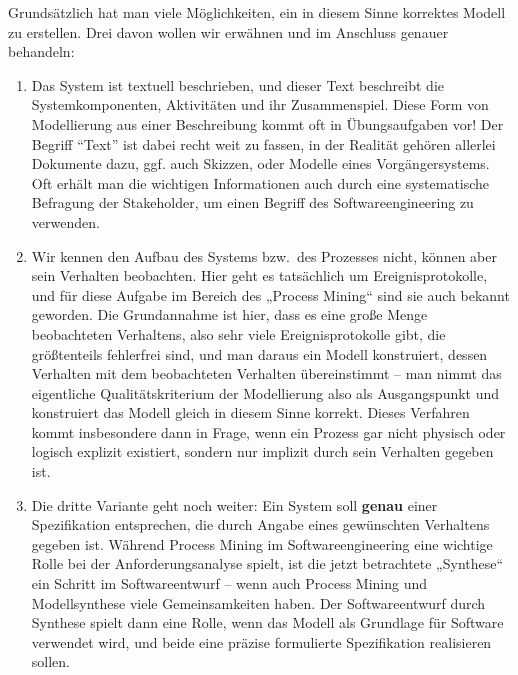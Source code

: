 Grundsätzlich hat man viele Möglichkeiten, ein in diesem Sinne korrektes Modell zu erstellen. Drei davon wollen wir erwähnen und im Anschluss genauer behandeln:
\begin{enumerate}
	\item Das System 
	ist textuell beschrieben, und dieser Text beschreibt die Systemkomponenten, Aktivitäten und ihr Zusammenspiel. Diese Form von Modellierung aus einer Beschreibung kommt oft in Übungsaufgaben vor! Der Begriff "`Text"' ist dabei recht weit zu fassen, in der Realität gehören allerlei Dokumente dazu, ggf. auch Skizzen, oder Modelle eines Vorgängersystems. Oft erhält man die wichtigen Informationen auch durch eine systematische Befragung der Stakeholder, um einen Begriff des Softwareengineering zu verwenden. 
	\item Wir kennen 
	den Aufbau des Systems bzw.\ des Prozesses nicht, können aber sein Verhalten beobachten. Hier geht es tatsächlich um Ereignisprotokolle, und für diese Aufgabe im Bereich des „Process Mining“ sind sie auch bekannt geworden. Die Grundannahme ist hier, dass es eine große Menge beobachteten Verhaltens, also sehr viele Ereignisprotokolle gibt, die größtenteils fehlerfrei sind, und man daraus ein Modell konstruiert, dessen Verhalten mit dem beobachteten Verhalten übereinstimmt -- man nimmt das eigentliche Qualitäts\-kriterium der Modellierung also als Ausgangspunkt und konstruiert das Modell gleich in diesem Sinne korrekt. Dieses Verfahren kommt insbesondere dann in Frage, wenn ein Prozess gar nicht physisch oder logisch explizit existiert, sondern nur implizit durch sein Verhalten gegeben ist.
	\item Die dritte Variante 
	geht noch weiter: Ein System soll \textbf{genau} einer Spezifikation entsprechen, die durch Angabe eines gewünschten Verhaltens gegeben ist. Während Process Mining im Softwareengineering eine wichtige Rolle bei der Anforderungsanalyse spielt, ist die jetzt betrachtete „Synthese“ ein Schritt im Softwareentwurf -- wenn auch Process Mining und Modellsynthese viele Gemeinsamkeiten haben. Der Softwareentwurf durch Synthese spielt dann eine Rolle, wenn das Modell als Grundlage für Software verwendet wird, und beide eine präzise formulierte Spezifikation realisieren sollen. 
\end{enumerate}

